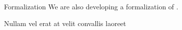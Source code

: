 \documentclass[usenames, dvipsnames, final]{beamer}
\newlength{\sepwidth}
\newlength{\colwidth}
\newcommand{\separatorcolumn}{\begin{column}{\sepwidth}\end{column}}
\begin{document}
\begin{frame}[t]
\begin{columns}[t]
\begin{column}{\colwidth}
\begin{block}{Formalization}
       We are also developing a formalization of \langName.
  \end{block}

  \begin{block}{Nullam vel erat at velit convallis laoreet}
  \end{block}




\end{column}

\separatorcolumn
\end{columns}
\end{frame}
\end{document}
